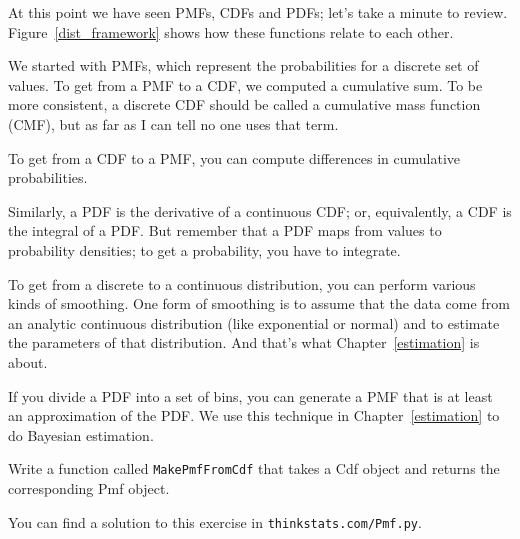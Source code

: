 \documentclass[12pt]{book}
\begin{document}
At this point we have seen PMFs, CDFs and PDFs; let's take a minute
to review.  Figure~\ref{dist_framework} shows how these functions relate
to each other.


We started with PMFs, which represent the probabilities for a discrete
set of values.  To get from a PMF to a CDF, we computed a cumulative sum.
To be more consistent, a discrete CDF should be called a cumulative mass
function (CMF), but as far as I can tell no one uses that term.


To get from a CDF to a PMF, you can compute differences in cumulative
probabilities.


Similarly, a PDF is the derivative of a continuous CDF; or, equivalently,
a CDF is the integral of a PDF.  But remember that a PDF maps from
values to probability densities; to get a probability, you have to
integrate.


To get from a discrete to a continuous distribution, you can perform
various kinds of smoothing.  One form of smoothing is to assume that
the data come from an analytic continuous distribution
(like exponential or normal) and to estimate the parameters of that
distribution.  And that's what Chapter~\ref{estimation} is about.



If you divide a PDF into a set of bins, you can generate a PMF that is
at least an approximation of the PDF.  We use this
technique in Chapter~\ref{estimation} to do Bayesian estimation.


\begin{exercise}
Write a function called {\tt MakePmfFromCdf} that takes a Cdf object
and returns the corresponding Pmf object.

You can find a solution to this exercise in {\tt thinkstats.com/Pmf.py}.


\end{exercise}
\end{document}
